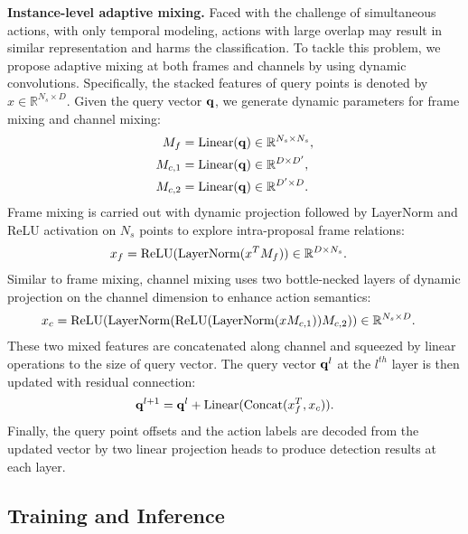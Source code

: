 \documentclass{article}
\renewcommand{\paragraph}[1]{\vspace{1.25mm}\noindent\textbf{#1}}
\begin{document}
\paragraph{Instance-level adaptive mixing.}
Faced with the challenge of simultaneous actions, with only temporal modeling, actions with large overlap may result in similar representation and harms the classification. To tackle this problem, we propose adaptive mixing at both frames and channels by using dynamic convolutions. 
Specifically, the stacked features of query points is denoted by $x \in \mathbb{R}^{N_s \times D}$. Given the query vector {${\bf q}$}, we generate dynamic parameters for frame mixing and channel mixing: 
\begin{align}
    M_f &= {\rm Linear}({\bf q}) \in \mathbb{R}^{N_s \times N_s}, \\
    M_{c,1} &= {\rm Linear} ({\bf q}) \in \mathbb{R}^{D \times D'}, \\
     M_{c,2} &= {\rm Linear} ({\bf q}) \in \mathbb{R}^{D' \times D}. 
\end{align}
Frame mixing is carried out with dynamic projection followed by LayerNorm and ReLU activation on $N_s$ points to explore intra-proposal frame relations:
\begin{align}
    x_f &= {\rm ReLU}({\rm LayerNorm}(x^TM_f)) \in \mathbb{R}^{D \times N_s} . 
\end{align}
Similar to frame mixing, channel mixing uses two bottle-necked layers of dynamic projection on the channel dimension to enhance action semantics:
\begin{align}
    x_c &= {\rm ReLU}({\rm LayerNorm}({\rm ReLU}({\rm LayerNorm}(xM_{c,1}))M_{c,2})) \in \mathbb{R}^{N_s \times D}.
\end{align}
These two mixed features are concatenated along channel and squeezed by linear operations to the size of query vector. The query vector ${\bf q}^l$ at the $l^{th}$ layer is then updated with residual connection:
\begin{align}
 {\bf q}^{l+1} = {\bf q}^l + {\rm Linear}({\rm Concat}(x_f^T, x_c)).
\end{align}
Finally, the query point offsets and the action labels are decoded from the updated vector by two linear projection heads to produce detection results at each layer.

\subsection{Training and Inference}
\end{document}
